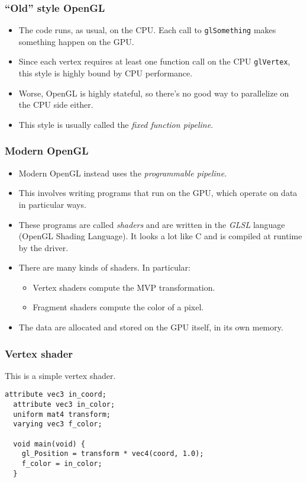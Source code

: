 \begin{frame}
  \frametitle{``Old'' style OpenGL}
  \begin{itemize}
  \item The code runs, as usual, on the CPU. Each call to \texttt{glSomething}
    makes something happen on the GPU.
  \item Since each vertex requires at least one function call on the CPU
    \texttt{glVertex}, this style is highly bound by CPU performance.
  \item Worse, OpenGL is highly stateful, so there's no good way to parallelize
    on the CPU side either.
  \item This style is usually called the \emph{fixed function pipeline}.
  \end{itemize}
\end{frame}

\begin{frame}
  \frametitle{Modern OpenGL}
  \begin{itemize}
  \item Modern OpenGL instead uses the \emph{programmable pipeline}.
  \item This involves writing programs that run on the GPU, which operate on
    data in particular ways.
  \item These programs are called \emph{shaders} and are written in the
    \emph{GLSL} language (OpenGL Shading Language). It looks a lot like C and is
    compiled at runtime by the driver.
  \item There are many kinds of shaders. In particular:
    \begin{itemize}
    \item Vertex shaders compute the MVP transformation.
    \item Fragment shaders compute the color of a pixel.
    \end{itemize}
  \item The data are allocated and stored on the GPU itself, in its own memory.
  \end{itemize}
\end{frame}

\begin{frame}[fragile]
  \frametitle{Vertex shader}
  This is a simple vertex shader.
  \begin{lstlisting}[style=glsl]
  attribute vec3 in_coord;
  attribute vec3 in_color;
  uniform mat4 transform;
  varying vec3 f_color;

  void main(void) {
    gl_Position = transform * vec4(coord, 1.0);
    f_color = in_color;
  }
  \end{lstlisting}
\end{frame}

